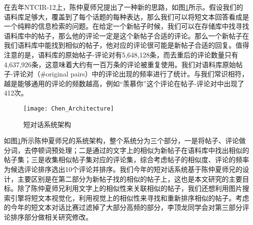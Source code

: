 在去年NTCIR-12上，陈仲夏师兄提出了一种新的思路，如图\ref{fig:Chen_Architecture}所示。假设我们的语料库足够大，覆盖到了每个话题的每种表达，那么我们可以将短文本回答看成是一个纯粹的信息检索的问题。在给定一个新帖子时候，我们可以在存储库中找寻找语料库中的帖子，那么他的评论一定是这个新帖子合适的评论。那么一个新帖子在我们语料库中能找到相似的帖子，他对应的评论很可能是新帖子合适的回复。值得注意的是，语料库的原始帖子-评论对有5,648,128条，而去重后的评论数量只有4,637,926条，这意味着大约有一百万条的评论被重复使用。我们对语料库原始帖子-评论对（\#original pairs）中的评论出现的频率进行了统计。与我们常识相符，越是能够通用的评论的频数越高，例如“羡慕你”这个评论在帖子-评论对中出现了412次。

\begin{figure}[ht]
\centering
\texttt{[image: Chen\_Architecture]}
\caption{短对话系统架构} \label{fig:Chen_Architecture}
\end{figure}

如图\ref{fig:Chen_Architecture}所示陈仲夏师兄的系统架构，整个系统分为三个部分，一是将帖子、评论做分词，去停顿词预处理；二是通过的文字上的相似为新帖子在语料库中找出相似的帖子集；三是收集相似帖子集对应的评论集，综合考虑帖子的相似度、评论的频率为候选评论排序选出10个评论并排序。我们今年的短对话系统基于陈仲夏师兄的设计，主要区别是在第二部分为新帖子找的相似的帖子上，这也是本文研究的主要目标。除了陈仲夏师兄利用文字上的相似性来关联相似的帖子，我们还想利用图片搜索引擎将短文本视觉化，利用视觉上的相似性来寻找和重新排序相似的帖子。考虑的今年的短文本对话比赛过滤掉了大部分高频的部分，李顶龙同学会对第三部分评论排序部分做相关研究修改。




